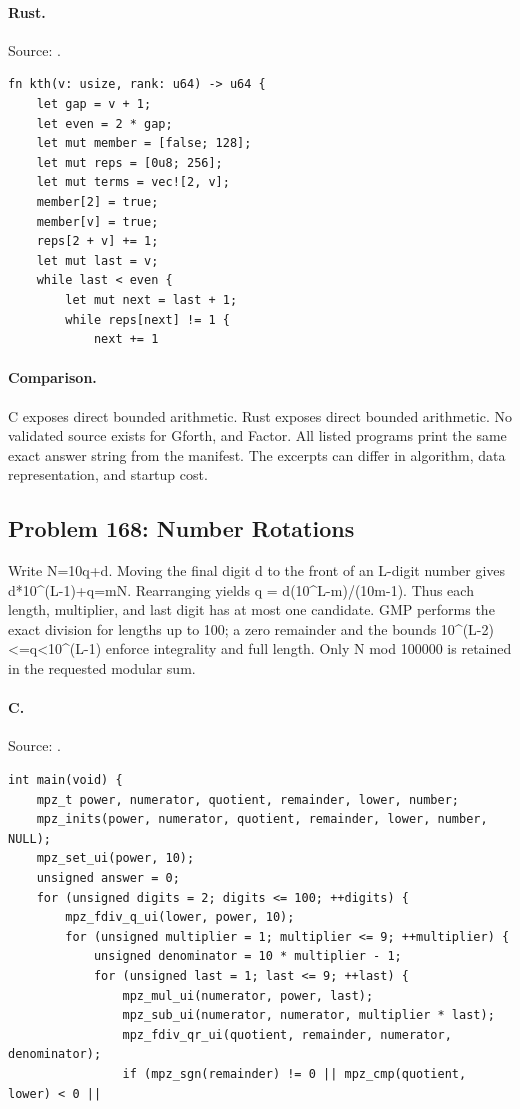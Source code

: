 \paragraph{Rust.} Source: .
\begin{lstlisting}
fn kth(v: usize, rank: u64) -> u64 {
    let gap = v + 1;
    let even = 2 * gap;
    let mut member = [false; 128];
    let mut reps = [0u8; 256];
    let mut terms = vec![2, v];
    member[2] = true;
    member[v] = true;
    reps[2 + v] += 1;
    let mut last = v;
    while last < even {
        let mut next = last + 1;
        while reps[next] != 1 {
            next += 1
\end{lstlisting}

\paragraph{Comparison.}
C exposes direct bounded arithmetic. Rust exposes direct bounded arithmetic.
No validated source exists for Gforth, and Factor.
All listed programs print the same exact answer string from the manifest. The excerpts can differ in algorithm, data representation, and startup cost.

\subsection{Problem 168: Number Rotations}
\label{walkthrough:p168}
Write N=10q+d. Moving the final digit d to the front of an L-digit number gives d*10\textasciicircum{}(L-1)+q=mN. Rearranging yields q = d(10\textasciicircum{}L-m)/(10m-1). Thus each length, multiplier, and last digit has at most one candidate. GMP performs the exact division for lengths up to 100; a zero remainder and the bounds 10\textasciicircum{}(L-2)<=q<10\textasciicircum{}(L-1) enforce integrality and full length. Only N mod 100000 is retained in the requested modular sum.

\paragraph{C.} Source: .
\begin{lstlisting}
int main(void) {
    mpz_t power, numerator, quotient, remainder, lower, number;
    mpz_inits(power, numerator, quotient, remainder, lower, number, NULL);
    mpz_set_ui(power, 10);
    unsigned answer = 0;
    for (unsigned digits = 2; digits <= 100; ++digits) {
        mpz_fdiv_q_ui(lower, power, 10);
        for (unsigned multiplier = 1; multiplier <= 9; ++multiplier) {
            unsigned denominator = 10 * multiplier - 1;
            for (unsigned last = 1; last <= 9; ++last) {
                mpz_mul_ui(numerator, power, last);
                mpz_sub_ui(numerator, numerator, multiplier * last);
                mpz_fdiv_qr_ui(quotient, remainder, numerator, denominator);
                if (mpz_sgn(remainder) != 0 || mpz_cmp(quotient, lower) < 0 ||
\end{lstlisting}

